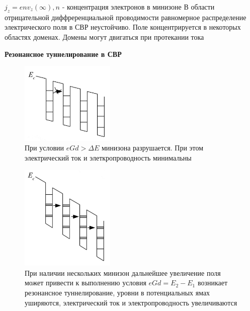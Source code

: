 $j_z=e n v_z(\infty), n$ - концентрация электронов в минизоне
В области отрицательной диффреренциальной проводимости равномерное распределение электрического поля в СВР неустойчиво. Поле концентрируется в некоторых областях доменах. Домены могут двигаться при протекании тока

\textbf{Резонансное туннелирование в СВР}

\begin{figure}[h!]
\centering
 \includegraphics[width=0.4\textwidth]{images/ph30.10.1.jpg}
 \caption*{При условии $eGd > \Delta E$ минизона
разрушается. При этом электрический
ток и элеткропроводность минимальны}
\end{figure}

\begin{figure}[h!]
\centering
 \includegraphics[width=0.4\textwidth]{images/ph30.10.2.jpg}
 \caption*{При наличии нескольких минизон
дальнейшее увеличение поля может
привести к выполнению условия
$eGd =E_2-E_1 $ возникает резонансное
туннелирование, уровни в
потенциальных ямах уширяются,
электрический ток и
электропроводность увеличиваются}
\end{figure}


